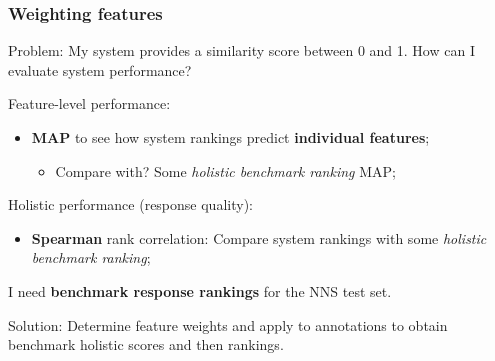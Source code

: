 \documentclass[handout,xcolor={dvipsnames}]{beamer}
\begin{document}
\begin{frame}
\frametitle{Weighting features}

Problem: My system provides a similarity score between 0 and 1. How can I evaluate system performance?

\vspace{1em}
Feature-level performance:
\begin{itemize}
\item \textbf{MAP} to see how system rankings predict \textbf{individual features};
\begin{itemize}
\item Compare with? Some \textit{holistic benchmark ranking} MAP;
\end{itemize}
\end{itemize}

\vspace{.3em}
Holistic performance (response quality):
\begin{itemize}
\item \textbf{Spearman} rank correlation: Compare system rankings with some \textit{holistic benchmark ranking};
\end{itemize}

I need \textbf{benchmark response rankings} for the NNS test set.

\vspace{1em}
Solution: Determine feature weights and apply to annotations to obtain benchmark holistic scores and then rankings.
\end{frame}
\end{document}
